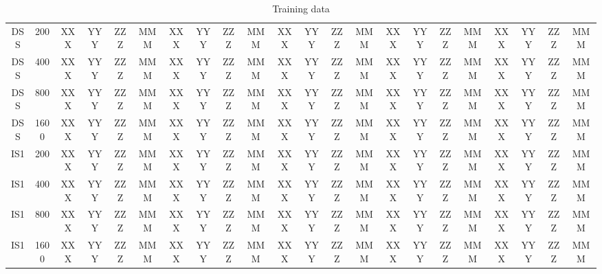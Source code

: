 \documentclass[10pt]{article}
\begin{document}
\begin{table}
\begin{tabular}{ cc||c c c c | c c c c | c c c c | c c c c| c c c c}
 					DSS & 200 & XXX & YYY & ZZZ & MMM & XXX & YYY & ZZZ & MMM& XXX & YYY & ZZZ & MMM& XXX & YYY & ZZZ & MMM & XXX & YYY & ZZZ & MMM \\ 
 					DSS & 400 & XXX & YYY & ZZZ & MMM & XXX & YYY & ZZZ & MMM& XXX & YYY & ZZZ & MMM& XXX & YYY & ZZZ & MMM & XXX & YYY & ZZZ & MMM\\ 
 					DSS & 800 & XXX & YYY & ZZZ & MMM & XXX & YYY & ZZZ & MMM& XXX & YYY & ZZZ & MMM& XXX & YYY & ZZZ & MMM & XXX & YYY & ZZZ & MMM\\ 
 					DSS & 1600 & XXX & YYY & ZZZ & MMM & XXX & YYY & ZZZ & MMM& XXX & YYY & ZZZ & MMM& XXX & YYY & ZZZ & MMM & XXX & YYY & ZZZ & MMM\\ \hline
 					IS1 & 200 & XXX & YYY & ZZZ & MMM & XXX & YYY & ZZZ & MMM& XXX & YYY & ZZZ & MMM& XXX & YYY & ZZZ & MMM & XXX & YYY & ZZZ & MMM\\ 
 					IS1 & 400 & XXX & YYY & ZZZ & MMM & XXX & YYY & ZZZ & MMM& XXX & YYY & ZZZ & MMM& XXX & YYY & ZZZ & MMM & XXX & YYY & ZZZ & MMM\\ 
 					IS1 & 800 & XXX & YYY & ZZZ & MMM & XXX & YYY & ZZZ & MMM& XXX & YYY & ZZZ & MMM& XXX & YYY & ZZZ & MMM & XXX & YYY & ZZZ & MMM\\ 
 					IS1 & 1600 & XXX & YYY & ZZZ & MMM & XXX & YYY & ZZZ & MMM& XXX & YYY & ZZZ & MMM& XXX & YYY & ZZZ & MMM & XXX & YYY & ZZZ & MMM\\ \hline
 \hline
  \end{tabular}
  \caption{Training data}
\end{table}
\end{document}
